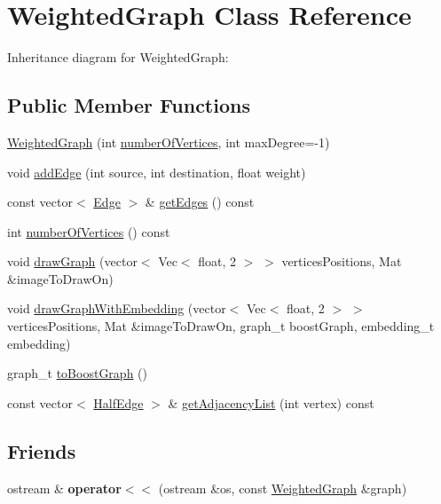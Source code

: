 \hypertarget{class_weighted_graph}{\section{Weighted\-Graph Class Reference}
\label{class_weighted_graph}
}


Inheritance diagram for Weighted\-Graph\-:
\subsection*{Public Member Functions}
\begin{DoxyCompactItemize}
\item 
\hyperlink{class_weighted_graph_a567ecc243c75a3d6a8905670d08ada82}{Weighted\-Graph} (int \hyperlink{class_weighted_graph_ac6c8807a6c023525baec8525553c03eb}{number\-Of\-Vertices}, int max\-Degree=-\/1)
\item 
void \hyperlink{class_weighted_graph_a3bf3d91dd58ff3fc39fdb82034a7aa51}{add\-Edge} (int source, int destination, float weight)
\item 
const vector$<$ \hyperlink{struct_edge}{Edge} $>$ \& \hyperlink{class_weighted_graph_aa7298cc529e17edcb37672f8a99d6b9d}{get\-Edges} () const 
\item 
int \hyperlink{class_weighted_graph_ac6c8807a6c023525baec8525553c03eb}{number\-Of\-Vertices} () const 
\item 
void \hyperlink{class_weighted_graph_a44f6317544e38f738556a99ec2c3afbc}{draw\-Graph} (vector$<$ Vec$<$ float, 2 $>$ $>$ vertices\-Positions, Mat \&image\-To\-Draw\-On)
\item 
void \hyperlink{class_weighted_graph_a22567ab413fdf04c2012465696b6dadd}{draw\-Graph\-With\-Embedding} (vector$<$ Vec$<$ float, 2 $>$ $>$ vertices\-Positions, Mat \&image\-To\-Draw\-On, graph\-\_\-t boost\-Graph, embedding\-\_\-t embedding)
\item 
graph\-\_\-t \hyperlink{class_weighted_graph_adeea80029e36859b8ff567eaa1d02ef4}{to\-Boost\-Graph} ()
\item 
const vector$<$ \hyperlink{struct_half_edge}{Half\-Edge} $>$ \& \hyperlink{class_weighted_graph_ab6952debe4a19bdfadce2f31c229107d}{get\-Adjacency\-List} (int vertex) const 
\end{DoxyCompactItemize}
\subsection*{Friends}
\begin{DoxyCompactItemize}
\item 
\hypertarget{class_weighted_graph_ae85c694f23de7587ee0631c6062297b6}{ostream \& {\bfseries operator$<$$<$} (ostream \&os, const \hyperlink{class_weighted_graph}{Weighted\-Graph} \&graph)}\label{class_weighted_graph_ae85c694f23de7587ee0631c6062297b6}

\end{DoxyCompactItemize}


